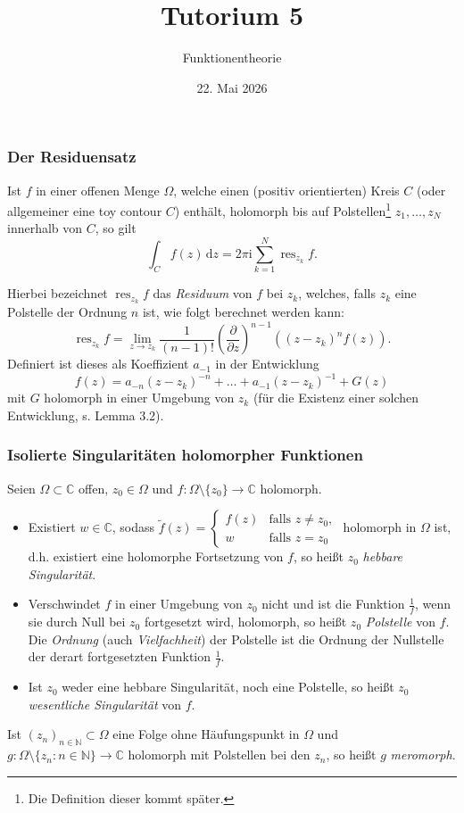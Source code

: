\documentclass[10pt]{beamer}
\author[\url{https://fdf-uni.github.io/ft}]{}
\title{Tutorium 5}
\subtitle{\texorpdfstring{Funktionentheorie\vspace*{-1.5cm}}{Funktionentheorie}}
\date{22. Mai 2026}
\newcommand{\iu}{\mathrm{i}}
\begin{document}
\begin{frame}
	\titlepage
\end{frame}
\begin{frame}
	\frametitle{Der Residuensatz}
	\begin{theorem}
		Ist $f$ in einer offenen Menge $\Omega$, welche einen (positiv orientierten) Kreis $C$ (oder allgemeiner eine toy contour $C$) enthält, holomorph bis auf Polstellen\footnote{Die Definition dieser kommt später.} $z_1, \dots, z_N$ innerhalb von $C$, so gilt
		\[
			\int_{C} f(z) \,\mathrm{d}z = 2 \pi \iu \sum_{k=1}^{N} \operatorname{res}_{z_k} f.
		\]
	\end{theorem}
	\pause
	Hierbei bezeichnet $\operatorname{res}_{z_k} f$ das \emph{Residuum} von $f$ bei $z_k$, welches, falls $z_k$ eine Polstelle der Ordnung $n$ ist, wie folgt berechnet werden kann:\vspace*{-0.15cm}
	\[
		\operatorname{res}_{z_k} f = \lim_{z \to z_k} \frac{1}{(n-1)!} \left( \frac{\partial}{\partial z} \right)^{n-1} ((z - z_k)^n f(z)).
	\]\vspace*{-0.15cm}
	\pause
	Definiert ist dieses als Koeffizient $a_{-1}$ in der Entwicklung
	\[
		f(z) = a_{-n} (z - z_k)^{-n} + \dots + a_{-1} (z - z_k)^{-1} + G(z)
	\]
	mit $G$ holomorph in einer Umgebung von $z_k$ (für die Existenz einer solchen Entwicklung, s. Lemma 3.2).
\end{frame}
\begin{frame}
	\frametitle{Isolierte Singularitäten holomorpher Funktionen}
	Seien $\Omega \subset \mathbb{C}$ offen, $z_0 \in \Omega$ und $f \colon \Omega \setminus \{z_0\} \to \mathbb{C}$ holomorph.
	\pause
	\begin{itemize}
		\item Existiert $w \in \mathbb{C}$, sodass $\tilde{f}(z) = \begin{cases} f(z) & \text{falls } z \neq z_0, \\ w & \text{falls } z = z_0 \end{cases}$ holomorph in $\Omega$ ist, d.h. existiert eine holomorphe Fortsetzung von $f$, so heißt $z_0$ \emph{hebbare Singularität}.
		      \pause
		\item Verschwindet $f$ in einer Umgebung von $z_0$ nicht und ist die Funktion $\frac{1}{f}$, wenn sie durch Null bei $z_0$ fortgesetzt wird, holomorph, so heißt $z_0$ \emph{Polstelle} von $f$.
		      Die \emph{Ordnung} (auch \emph{Vielfachheit}) der Polstelle ist die Ordnung der Nullstelle der derart fortgesetzten Funktion $\frac{1}{f}$.
		      \pause
		\item Ist $z_0$ weder eine hebbare Singularität, noch eine Polstelle, so heißt $z_0$ \emph{wesentliche Singularität} von $f$.
	\end{itemize}
	\pause
	Ist $(z_n)_{n \in \mathbb{N}} \subset \Omega$ eine Folge ohne Häufungspunkt in $\Omega$ und $g \colon \Omega \setminus \{z_n : n \in \mathbb{N}\} \to \mathbb{C}$ holomorph mit Polstellen bei den $z_n$, so heißt $g$ \emph{meromorph}.
\end{frame}
\end{document}
